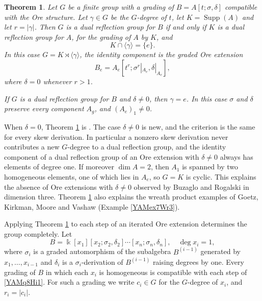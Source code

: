 \documentclass[reqno]{amsart}
\numberwithin{equation}{section}
\theoremstyle{definition}
\theoremstyle{remark}
\theoremstyle{plain}
\newtheorem{introtheorem}{Theorem}
\newcommand{\kk}{\Bbbk}
\DeclareMathOperator{\supp}{Supp}
\begin{document}
\begin{introtheorem}\label{YAMb4Lx9}
Let $G$ be a finite group with a grading of $B=A[t;\sigma,\delta]$ compatible with the Ore structure. Let $\gamma\in G$ be the $G$-degree of $t$, let $K=\supp(A)$ and let $r=|\gamma|$. Then $G$ is a dual reflection group for $B$ if and only if $K$ is a dual reflection group for $A$, for the grading of $A$ by $K$, and
\[
K\cap\langle\gamma\rangle=\{e\}.
\]
In this case $G=K\rtimes\langle\gamma\rangle$, the identity component is the graded Ore extension
\[
B_e=A_e[t^r;\sigma^r|_{A_e},\delta|_{A_e}],
\]
where $\delta=0$ whenever $r>1$.

If $G$ is a dual reflection group for $B$ and $\delta\neq0$, then $\gamma=e$. In this case $\sigma$ and $\delta$ preserve every component $A_g$, and $(A_e)_1\neq0$.
\end{introtheorem}

When $\delta=0$, Theorem \ref{YAMb4Lx9} is \cite[Proposition 6.1]{BR}. The case $\delta\neq0$ is new, and the criterion is the same for every skew derivation. In particular a nonzero skew derivation never contributes a new $G$-degree to a dual reflection group, and the identity component of a dual reflection group of an Ore extension with $\delta\neq0$ always has elements of degree one. If moreover $\dim A=2$, then $A_1$ is spanned by two homogeneous elements, one of which lies in $A_e$, so $G=K$ is cyclic. This explains the absence of Ore extensions with $\delta\neq0$ observed by Buzaglo and Rogalski in dimension three. Theorem \ref{YAMb4Lx9} also explains the wreath product examples of Goetz, Kirkman, Moore and Vashaw (Example \ref{YAMex7Wr3}).

Applying Theorem \ref{YAMb4Lx9} to each step of an iterated Ore extension determines the group completely. Let
\begin{equation}\label{YAMq8Hi1}
B=\kk[x_1][x_2;\sigma_2,\delta_2]\cdots[x_n;\sigma_n,\delta_n],\quad\deg x_i=1,
\end{equation}
where $\sigma_i$ is a graded automorphism of the subalgebra $B^{(i-1)}$ generated by $x_1,\dots,x_{i-1}$ and $\delta_i$ is a $\sigma_i$-derivation of $B^{(i-1)}$ raising degrees by one. Every grading of $B$ in which each $x_i$ is homogeneous is compatible with each step of \eqref{YAMq8Hi1}. For such a grading we write $c_i\in G$ for the $G$-degree of $x_i$, and $r_i=|c_i|$.
\end{document}
